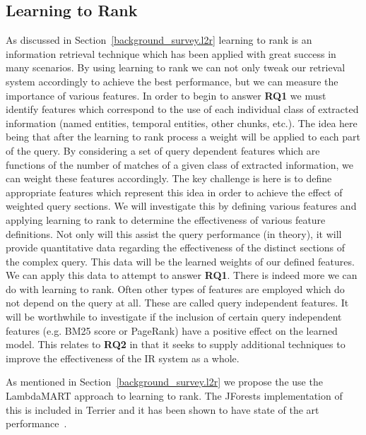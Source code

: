 \documentclass{mprop}
\let\oldcite=\cite
\renewcommand\cite[1]{\ifthenelse{\equal{#1}{NEEDED}}{\ensuremath{^\texttt{[citation~needed]}}}{\oldcite{#1}}}
\begin{document}
\subsection{Learning to Rank} \label{proposed_approach.l2r}
As discussed in Section~\ref{background_survey.l2r} learning to rank is an information retrieval technique which has been applied with great success in many scenarios.
By using learning to rank we can not only tweak our retrieval system accordingly to achieve the best performance, but we can measure the importance of various features.
In order to begin to answer \textbf{RQ1} we must identify features which correspond to the use of each individual class of extracted information (named entities, temporal entities, other chunks, etc.).
The idea here being that after the learning to rank process a weight will be applied to each part of the query.
By considering a set of query dependent features which are functions of the number of matches of a given class of extracted information, we can weight these features accordingly.
The key challenge is here is to define appropriate features which represent this idea in order to achieve the effect of weighted query sections. 
We will investigate this by defining various features and applying learning to rank to determine the effectiveness of various feature definitions. 
Not only will this assist the query performance (in theory), it will provide quantitative data regarding the effectiveness of the distinct sections of the complex query. This data will be the learned weights of our defined features. 
We can apply this data to attempt to answer \textbf{RQ1}.
There is indeed more we can do with learning to rank.
Often other types of features are employed which do not depend on the query at all. 
These are called query independent features.
It will be worthwhile to investigate if the inclusion of certain query independent features (e.g. BM25 score or PageRank) have a positive effect on the learned model.
This relates to \textbf{RQ2} in that it seeks to supply additional techniques to improve the effectiveness of the IR system as a whole.

As mentioned in Section~\ref{background_survey.l2r} we propose the use the LambdaMART approach to learning to rank. The JForests implementation of this is included in Terrier and it has been shown to have state of the art performance~\cite{NEEDED}.
\end{document}
